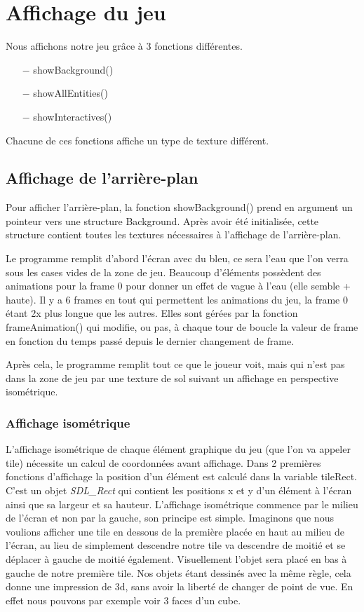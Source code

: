 \documentclass[french, 12pt]{article}
\begin{document}
\section{Affichage du jeu}


Nous affichons notre jeu grâce à 3 fonctions différentes.
\begin{itemize}
    \item[$-$] showBackground()
    \item[$-$] showAllEntities()
    \item[$-$] showInteractives()
\end{itemize}

Chacune de ces fonctions affiche un type de texture différent.

    \subsection{Affichage de l'arrière-plan}

    Pour afficher l'arrière-plan, la fonction showBackground() prend en argument un pointeur vers une structure Background. Après avoir été initialisée, cette structure contient toutes les textures nécessaires à l'affichage de l'arrière-plan.

    Le programme remplit d'abord l'écran avec du bleu, ce sera l'eau que l'on verra sous les cases vides de la zone de jeu.
    Beaucoup d'éléments possèdent des animations pour la frame 0 pour donner un effet de vague à l'eau (elle semble + haute).
    Il y a 6 frames en tout qui permettent les animations du jeu, la frame 0 étant 2x plus longue que les autres. Elles sont gérées par la fonction frameAnimation() qui modifie, ou pas, à chaque tour de boucle la valeur de frame en fonction du temps passé depuis le dernier changement de frame.

    Après cela, le programme remplit tout ce que le joueur voit, mais qui n'est pas dans la zone de jeu par une texture de sol suivant un affichage en perspective isométrique.

        \subsubsection{Affichage isométrique}

        L'affichage isométrique de chaque élément graphique du jeu (que l'on va appeler tile) nécessite un calcul de coordonnées avant affichage. Dans 2 premières fonctions d'affichage la position d'un élément est calculé dans la variable tileRect. C'est un objet \textit{SDL\_Rect} qui contient les positions x et y d'un élément à l'écran ainsi que sa largeur et sa hauteur. L'affichage isométrique commence par le milieu de l'écran et non par la gauche, son principe est simple. Imaginons que nous voulions afficher une tile en dessous de la première placée en haut au milieu de l'écran, au lieu de simplement descendre notre tile va descendre de moitié et se déplacer à gauche de moitié également. Visuellement l'objet sera placé en bas à gauche de notre première tile. Nos objets étant dessinés avec la même règle, cela donne une impression de 3d, sans avoir la liberté de changer de point de vue. En effet nous pouvons par exemple voir 3 faces d'un cube.
\end{document}
